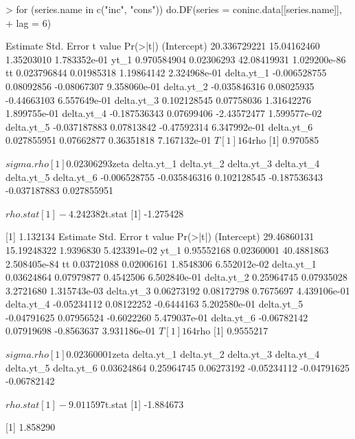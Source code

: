 \begin{Schunk}
\begin{Sinput}
> for (series.name in c("inc", "cons")) do.DF(series = coninc.data[[series.name]], 
+     lag = 6)
\end{Sinput}
\begin{Soutput}
                Estimate  Std. Error     t value     Pr(>|t|)
(Intercept) 20.336729221 15.04162460  1.35203010 1.783352e-01
yt_1         0.970584904  0.02306293 42.08419931 1.029200e-86
tt           0.023796844  0.01985318  1.19864142 2.324968e-01
delta.yt_1  -0.006528755  0.08092856 -0.08067307 9.358060e-01
delta.yt_2  -0.035846316  0.08025935 -0.44663103 6.557649e-01
delta.yt_3   0.102128545  0.07758036  1.31642276 1.899755e-01
delta.yt_4  -0.187536343  0.07699406 -2.43572477 1.599577e-02
delta.yt_5  -0.037187883  0.07813842 -0.47592314 6.347992e-01
delta.yt_6   0.027855951  0.07662877  0.36351818 7.167132e-01
$T
[1] 164

$rho
[1] 0.970585

$sigma.rho
[1] 0.02306293

$zeta
  delta.yt_1   delta.yt_2   delta.yt_3   delta.yt_4   delta.yt_5   delta.yt_6 
-0.006528755 -0.035846316  0.102128545 -0.187536343 -0.037187883  0.027855951 

$rho.stat
[1] -4.242382

$t.stat
[1] -1.275428

[1] 1.132134
               Estimate  Std. Error    t value     Pr(>|t|)
(Intercept) 29.46860131 15.19248322  1.9396830 5.423391e-02
yt_1         0.95552168  0.02360001 40.4881863 2.508405e-84
tt           0.03721088  0.02006161  1.8548306 6.552012e-02
delta.yt_1   0.03624864  0.07979877  0.4542506 6.502840e-01
delta.yt_2   0.25964745  0.07935028  3.2721680 1.315743e-03
delta.yt_3   0.06273192  0.08172798  0.7675697 4.439106e-01
delta.yt_4  -0.05234112  0.08122252 -0.6444163 5.202580e-01
delta.yt_5  -0.04791625  0.07956524 -0.6022260 5.479037e-01
delta.yt_6  -0.06782142  0.07919698 -0.8563637 3.931186e-01
$T
[1] 164

$rho
[1] 0.9555217

$sigma.rho
[1] 0.02360001

$zeta
 delta.yt_1  delta.yt_2  delta.yt_3  delta.yt_4  delta.yt_5  delta.yt_6 
 0.03624864  0.25964745  0.06273192 -0.05234112 -0.04791625 -0.06782142 

$rho.stat
[1] -9.011597

$t.stat
[1] -1.884673

[1] 1.858290
\end{Soutput}
\end{Schunk}
